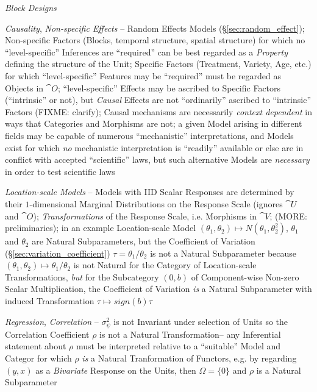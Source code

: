 \emph{Block Designs}

\emph{Causality}, \emph{Non-specific Effects} -- Random Effects Models
(\S\ref{sec:random_effect}); Non-specific Factors (Blocks, temporal structure,
spatial structure) for which no ``level-specific'' Inferences are ``required''
can be best regarded as a \emph{Property} defining the structure of the Unit;
Specific Factors (Treatment, Variety, Age, etc.) for which ``level-specific''
Features may be ``required'' must be regarded as Objects in $\cat{O}$;
``level-specific'' Effects may be ascribed to Specific Factors (``intrinsic'' or
not), but \emph{Causal} Effects are not ``ordinarily'' ascribed to ``intrinsic''
Factors (FIXME: clarify);
Causal mechanisms are necessarily \emph{context dependent} in ways that
Categories and Morphisms are not;
a given Model arising in different fields may be capable of numerous
``mechanistic'' interpretations, and Models exist for which \emph{no}
mechanistic interpretation is ``readily'' available or else are in conflict
with accepted ``scientific'' laws, but such alternative Models are
\emph{necessary} in order to test scientific laws

\emph{Location-scale Models} -- Models with IID Scalar Responses are determined
by their $1$-dimensional Marginal Distributions on the Response Scale (ignores
$\cat{U}$ and $\cat{O}$); \emph{Transformations} of the Response Scale, i.e.
Morphisms in $\cat{V}$; (MORE: preliminaries); in an example Location-scale
Model $(\theta_1, \theta_2) \mapsto N(\theta_1, \theta_2^2)$, $\theta_1$ and
$\theta_2$ are Natural Subparameters, but the Coefficient of Variation
(\S\ref{sec:variation_coefficient}) $\tau = \theta_1 / \theta_2$ is not
a Natural Subparameter because
$(\theta_1, \theta_2) \mapsto \theta_1 / \theta_2$ is not Natural for the
Category of Location-scale Transformations, \emph{but} for the Subcategory
$(0, b)$ of Component-wise Non-zero Scalar Multiplication, the Coefficient of
Variation \emph{is} a Natural Subparameter with induced Transformation
$\tau \mapsto sign(b) \tau$

\emph{Regression}, \emph{Correlation} -- $\sigma^2_\psi$ is not Invariant under
selection of Units so the Correlation Coefficient $\rho$ is not a Natural
Transformation-- any Inferential statement about $\rho$ must be interpreted
relative to a ``suitable'' Model and Categor for which $\rho$ \emph{is} a
Natural Tranformation of Functors, e.g. by regarding $(y, x)$ as a
\emph{Bivariate} Response on the Units, then $\Omega = \{ 0 \}$ and $\rho$ is a
Natural Subparameter


